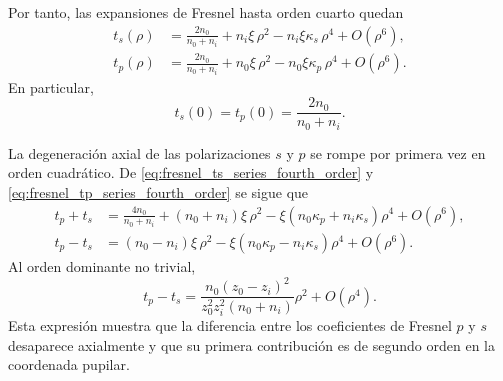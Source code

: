 Por tanto, las expansiones de Fresnel hasta orden cuarto quedan
\begin{align}
t_s(\rho)
&=
\frac{2n_0}{n_0+n_i}
+
n_i\xi\,\rho^2
-
n_i\xi\kappa_s\,\rho^4
+
O(\rho^6),
\label{eq:fresnel_ts_series_fourth_order}
\\[6pt]
t_p(\rho)
&=
\frac{2n_0}{n_0+n_i}
+
n_0\xi\,\rho^2
-
n_0\xi\kappa_p\,\rho^4
+
O(\rho^6).
\label{eq:fresnel_tp_series_fourth_order}
\end{align}
En particular,
\begin{equation}
t_s(0)=t_p(0)=\frac{2n_0}{n_0+n_i}.
\label{eq:fresnel_axis_degeneracy}
\end{equation}

La degeneración axial de las polarizaciones \(s\) y \(p\) se rompe por primera vez en orden cuadrático. De \eqref{eq:fresnel_ts_series_fourth_order} y \eqref{eq:fresnel_tp_series_fourth_order} se sigue que
\begin{align}
t_p+t_s
&=
\frac{4n_0}{n_0+n_i}
+
(n_0+n_i)\xi\,\rho^2
-
\xi(n_0\kappa_p+n_i\kappa_s)\rho^4
+
O(\rho^6),
\label{eq:tp_plus_ts_series_fourth_order}
\\[8pt]
t_p-t_s
&=
(n_0-n_i)\xi\,\rho^2
-
\xi(n_0\kappa_p-n_i\kappa_s)\rho^4
+
O(\rho^6).
\label{eq:tp_minus_ts_series_fourth_order}
\end{align}
Al orden dominante no trivial,
\begin{equation}
t_p-t_s
=
\frac{
n_0(z_0-z_i)^2
}{
z_0^2z_i^2(n_0+n_i)
}
\rho^2
+
O(\rho^4).
\label{eq:tp_minus_ts_quadratic_explicit}
\end{equation}
Esta expresión muestra que la diferencia entre los coeficientes de Fresnel \(p\) y \(s\) desaparece axialmente y que su primera contribución es de segundo orden en la coordenada pupilar.

